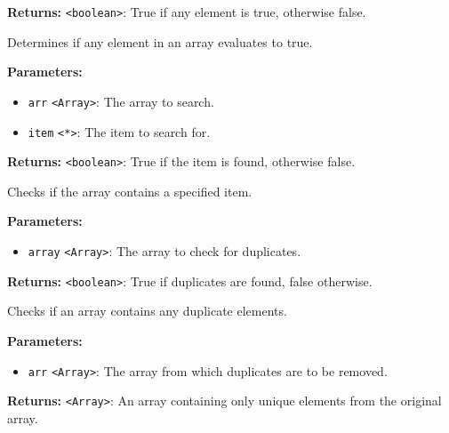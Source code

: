 \documentclass[12pt,a4paper]{article}
\begin{document}
\noindent \textbf{Returns:} \texttt{<boolean>}: True if any element is true, otherwise false.

\noindent Determines if any element in an array evaluates to true.

\vspace{5mm}
\noindent {}


\noindent \textbf{Parameters:}
\begin{itemize}
  \item \texttt{arr} \texttt{<Array>}: The array to search.
  \item \texttt{item} \texttt{<*>}: The item to search for.
\end{itemize}

\noindent \textbf{Returns:} \texttt{<boolean>}: True if the item is found, otherwise false.

\noindent Checks if the array contains a specified item.

\vspace{5mm}
\noindent {}


\noindent \textbf{Parameters:}
\begin{itemize}
  \item \texttt{array} \texttt{<Array>}: The array to check for duplicates.
\end{itemize}

\noindent \textbf{Returns:} \texttt{<boolean>}: True if duplicates are found, false otherwise.

\noindent Checks if an array contains any duplicate elements.

\vspace{5mm}
\noindent {}


\noindent \textbf{Parameters:}
\begin{itemize}
  \item \texttt{arr} \texttt{<Array>}: The array from which duplicates are to be removed.
\end{itemize}

\noindent \textbf{Returns:} \texttt{<Array>}: An array containing only unique elements from the original array.
\end{document}
